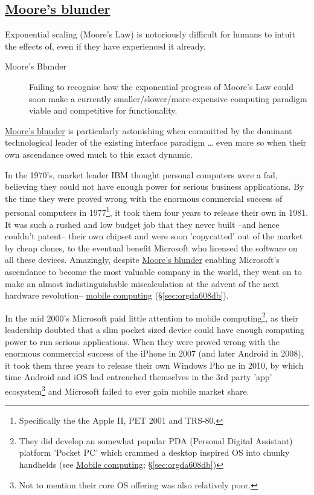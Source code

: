 \documentclass[logo,bsc,singlespacing,parskip]{infthesis}
\begin{document}
\subsection{\hyperref[org0c4dd05]{Moore's blunder}}
\label{sec:org065766c}
Exponential scaling (Moore's Law) is notoriously difficult for humans to intuit the effects of, even if they have experienced it already.

\begin{mdframed}
\begin{description}
\item[{\label{org0c4dd05}Moore's Blunder}] Failing to recognise how the exponential progress of Moore's Law could soon make a currently smaller/slower/more-expensive computing paradigm viable and competitive for functionality.
\end{description}
\end{mdframed}

\hyperref[org0c4dd05]{Moore's blunder} is particularly astonishing when committed by the dominant technological leader of the existing interface paradigm \ldots{} even more so when their own ascendance owed much to this exact dynamic.

In the 1970's, market leader IBM thought personal computers were a fad, believing they could not have enough power for serious business applications.
By the time they were proved wrong with the enormous commercial success of personal computers in 1977\footnote{Specifically the the Apple II, PET 2001 and TRS-80.}, it took them four years to release their own in 1981. It was such a rushed and low budget job that they never built --and hence couldn't patent-- their own chipset and were soon 'copycatted' out of the market by cheap clones, to the eventual benefit Microsoft who licensed the software on all these devices.
Amazingly, despite \hyperref[org0c4dd05]{Moore's blunder} enabling Microsoft's ascendance to become the most valuable company in the world, they went on to make an almost indistinguishable miscalculation at the advent of the next hardware revolution-- \hyperref[sec:orgda608db]{mobile computing} (\S \ref{sec:orgda608db}).

In the mid 2000's Microsoft paid little attention to mobile computing\footnote{They did develop an somewhat popular PDA (Personal Digital Assistant) platform 'Pocket PC' which crammed a desktop inspired OS into chunky handhelds (see \hyperref[sec:orgda608db]{Mobile computing}; \S \ref{sec:orgda608db})}, as their leadership doubted that a slim pocket sized device could have enough computing power to run serious applications.
When they were proved wrong with the enormous commercial success of the iPhone in 2007 (and later Android in 2008), it took them three years to release their own Windows Pho
ne in 2010, by which time Android and iOS had entrenched themselves in the 3rd party 'app' ecosystem\footnote{Not to mention their core OS offering was also relatively poor.} and Microsoft failed to ever gain mobile market share.
\end{document}
